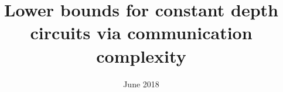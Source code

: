 \documentclass{article}
\title{Lower bounds for constant depth circuits via communication complexity}
\author{}
\date{June 2018}
\begin{document}
\maketitle








{}

\end{document}
